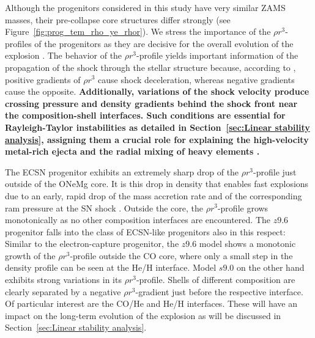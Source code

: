\documentclass[fleqn,usenatbib]{mnras}
\begin{document}
Although the progenitors considered in this study have very similar ZAMS masses, their pre-collapse core structures differ strongly (see Figure~\ref{fig:prog_tem_rho_ye_rhor}).
We stress the importance of the $\rho r^3$-profiles of the progenitors as they are decisive for the overall evolution of the explosion \citep{Kifonidis2003,Wongwathanarat2015}. The behavior of the $\rho r^3$-profile yields important information of the propagation of the shock through the stellar structure because, according to \cite{Sedov1961}, positive gradients of $\rho r^3$ cause shock deceleration, whereas negative gradients cause the opposite. \textbf{Additionally, variations of the shock velocity produce crossing pressure and density gradients behind the shock front near the composition-shell interfaces. Such conditions are essential for Rayleigh-Taylor instabilities as detailed in Section~\ref{sec:Linear stability analysis}, assigning them a crucial role for explaining the high-velocity metal-rich ejecta and the radial mixing of heavy elements \citep{Wongwathanarat2015}.}

The ECSN progenitor exhibits an extremely sharp drop of the $\rho r^3$-profile just outside of the ONeMg core. It is this drop in density that enables fast explosions due to an early, rapid drop of the mass accretion rate and of the corresponding ram pressure at the SN shock \citep{Kitaura2006}. Outside the core, the $\rho r^3$-profile grows monotonically as no other composition interfaces are encountered.
The $z9.6$ progenitor falls into the class of ECSN-like progenitors also in this respect: Similar to the electron-capture progenitor, the $z9.6$ model shows a monotonic growth of the $\rho r^3$-profile outside the CO core, where only a small step in the density profile can be seen at the He/H interface.
Model $s9.0$ on the other hand exhibits strong variations in its $\rho r^3$-profile. Shells of different composition are clearly separated by a negative $\rho r^3$-gradient just before the respective interface. Of particular interest are the CO/He and He/H interfaces. These will have an impact on the long-term evolution of the explosion as will be discussed in Section~\ref{sec:Linear stability analysis}.
\end{document}
